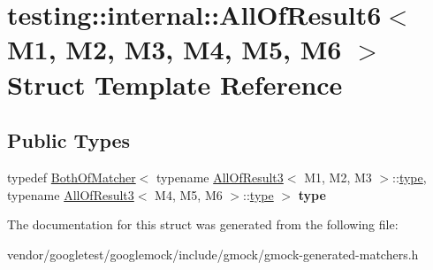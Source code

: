 \hypertarget{structtesting_1_1internal_1_1_all_of_result6}{}\section{testing\+:\+:internal\+:\+:All\+Of\+Result6$<$ M1, M2, M3, M4, M5, M6 $>$ Struct Template Reference}
\label{structtesting_1_1internal_1_1_all_of_result6}
\subsection*{Public Types}
\begin{DoxyCompactItemize}
\item 
\mbox{\label{structtesting_1_1internal_1_1_all_of_result6_a5385655911ce2c1d3fccd802c1754139}} 
typedef \mbox{\hyperlink{classtesting_1_1internal_1_1_both_of_matcher}{Both\+Of\+Matcher}}$<$ typename \mbox{\hyperlink{structtesting_1_1internal_1_1_all_of_result3}{All\+Of\+Result3}}$<$ M1, M2, M3 $>$\+::\mbox{\hyperlink{classtesting_1_1internal_1_1_both_of_matcher}{type}}, typename \mbox{\hyperlink{structtesting_1_1internal_1_1_all_of_result3}{All\+Of\+Result3}}$<$ M4, M5, M6 $>$\+::\mbox{\hyperlink{classtesting_1_1internal_1_1_both_of_matcher}{type}} $>$ {\bfseries type}
\end{DoxyCompactItemize}


The documentation for this struct was generated from the following file\+:\begin{DoxyCompactItemize}
\item 
vendor/googletest/googlemock/include/gmock/gmock-\/generated-\/matchers.\+h\end{DoxyCompactItemize}
